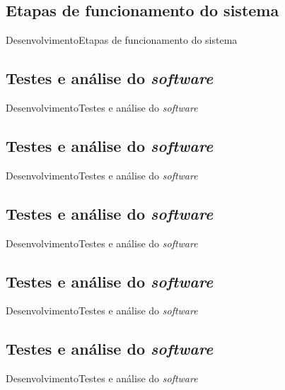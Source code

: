 \subsection{Etapas de funcionamento do sistema}
\begin{frame}{Desenvolvimento}{Etapas de funcionamento do sistema}

\end{frame}

\subsection{Testes e análise do \textit{software}}
\begin{frame}{Desenvolvimento}{Testes e análise do \textit{software}}

\end{frame}

\subsection{Testes e análise do \textit{software}}
\begin{frame}{Desenvolvimento}{Testes e análise do \textit{software}}

\end{frame}

\subsection{Testes e análise do \textit{software}}
\begin{frame}{Desenvolvimento}{Testes e análise do \textit{software}}

\end{frame}

\subsection{Testes e análise do \textit{software}}
\begin{frame}{Desenvolvimento}{Testes e análise do \textit{software}}

\end{frame}

\subsection{Testes e análise do \textit{software}}
\begin{frame}{Desenvolvimento}{Testes e análise do \textit{software}}

\end{frame}

